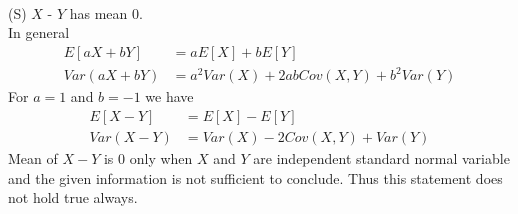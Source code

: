 \documentclass[journal,12pt,twocolumn]{IEEEtran}
\begin{document}
\\
(S) $X$ - $Y$ has mean $0$.\\
In general
\begin{align}
    E[aX+bY] &= aE[X]+bE[Y] \\
    Var(aX+bY) &= a^2Var(X)+2abCov(X,Y)+b^2Var(Y)
\end{align}
For $a=1$ and $b=-1$ we have
\begin{align}
  E[X-Y] &= E[X]-E[Y] \\
    Var(X-Y) &= Var(X)-2Cov(X,Y)+Var(Y)  
\end{align}
Mean of $X-Y$ is 0 only when $X$ and $Y$ are independent standard normal variable and the given information is not sufficient to conclude. Thus this statement does not hold true always. 
\end{document}
